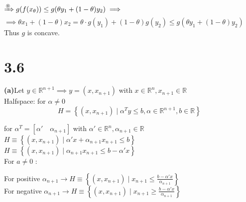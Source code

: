 \documentclass{article}
\begin{document}
\noindent $\xRightarrow{\circledast} g(f(x_\theta)) \leq g(\theta y_1 + (1-\theta) y_2) \implies$ \\

\noindent $\implies \theta x_1 + (1-\theta) x_2 = \theta \cdot g(y_1) + (1-\theta) g(y_2) \leq g(\theta y_1 + (1-\theta) y_2)$ \\

\noindent Thus $g$ is concave.


























\newpage
\section*{3.6}

\textbf{(a)}\noindent Let $y \in \mathbb{R}^{n+1} \implies y = (x, x_{n+1})$ with $x \in \mathbb{R}^n, x_{n+1} \in \mathbb{R}$ \\

\noindent Halfspace: for $\alpha \neq 0$
\[ H = \left\{ (x, x_{n+1}) \mid \alpha^T y \leq b, \alpha \in \mathbb{R}^{n+1}, b \in \mathbb{R} \right\} \]

\noindent for $\alpha^T = [ \alpha' \quad \alpha_{n+1} ]$ with $\alpha' \in \mathbb{R}^n, \alpha_{n+1} \in \mathbb{R}$ \\

\noindent $H \equiv \left\{ (x, x_{n+1}) \mid \alpha' x + \alpha_{n+1} x_{n+1} \leq b \right\}$ \\

\noindent $H \equiv \left\{ (x, x_{n+1}) \mid \alpha_{n+1} x_{n+1} \leq b - \alpha' x \right\}$ \\

For $a \neq 0$ :

\noindent For positive $\alpha_{n+1} \to H \equiv \left\{ (x, x_{n+1}) \mid x_{n+1} \leq \frac{b - \alpha' x}{\alpha_{n+1}} \right\}$ \\

\noindent For negative $\alpha_{n+1} \to H \equiv \left\{ (x, x_{n+1}) \mid x_{n+1} \geq \frac{b - \alpha' x}{\alpha_{n+1}} \right\}$ \\
\end{document}
